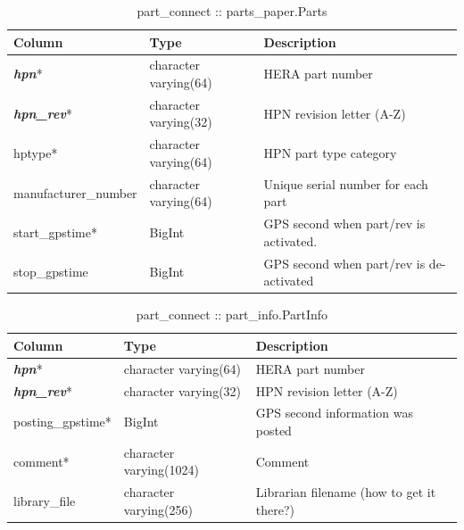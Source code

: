 \documentclass{article}[10pt]
\begin{document}
\begin{table}[h]
\centering
\caption{part\_connect :: parts\_paper.Parts}
\begin{tabular}{| l | l | l |} \hline
{\bf Column} & {\bf Type} & {\bf Description} \\ \hline
{\bf \em hpn}* & character varying(64) & HERA part number \\ \hline
{\bf \em hpn\_rev}* & character varying(32) & HPN revision letter (A-Z) \\ \hline
hptype*  &  character varying(64) & HPN part type category \\ \hline
manufacturer\_number & character varying(64) & Unique serial number for each part \\ \hline
start\_gpstime* & BigInt & GPS second when part/rev is activated. \\ \hline
stop\_gpstime & BigInt & GPS second when part/rev is de-activated \\ \hline
\end{tabular}
\end{table}

\begin{table}[h]
\centering
\caption{part\_connect :: part\_info.PartInfo}
\begin{tabular}{| l | l | l |} \hline
{\bf Column} & {\bf Type} & {\bf Description} \\ \hline
{\bf \em hpn}* & character varying(64) & HERA part number \\ \hline
{\bf \em hpn\_rev}* & character varying(32) & HPN revision letter (A-Z) \\ \hline
posting\_gpstime* & BigInt & GPS second information was posted \\ \hline
comment* &  character varying(1024) & Comment \\ \hline
library\_file & character varying(256) &  Librarian filename (how to get it there?) \\ \hline
\end{tabular}
\end{table}
\end{document}
